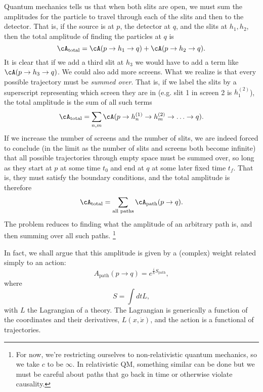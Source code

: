 Quantum mechanics tells us that when both slits are open, we must sum the amplitudes for the particle to travel through each of the slits and then to the detector. That is, if the source is at $p$, the detector at $q$, and the slits at $h_1,h_2$, then the total amplitude of finding the particles at $q$ is
\begin{equation}
    \cA_\text{total} = \cA(p \to h_1 \to q) + \cA(p \to h_2 \to q).
\end{equation}
It is clear that if we add a third slit at $h_3$ we would have to add a term like $\cA (p \to h_3 \to q)$. We could also add more screens. What we realize is that every possible trajectory must be \emph{summed over}. That is, if we label the slits by a superscript representing which screen they are in (e.g. slit 1 in screen 2 is $h_1^{(2)}$), the total amplitude is the sum of all such terms
\begin{equation}
    \cA_\text{total} = \sum_{n,m} \cA(p \to h_n^{(1)} \to h_m^{(2)} \to \ldots \to q).
\end{equation}
If we increase the number of screens and the number of slits, we are indeed forced to conclude (in the limit as the number of slits and screens both become infinite) that all possible trajectories through empty space must be summed over, so long as they start at $p$ at some time $t_0$ and end at $q$ at some later fixed time $t_f$. That is, they must satisfy the boundary conditions, and the total amplitude is therefore
\begin{equation}
    \cA_\text{total} = \sum_\text{all paths} \cA_\text{path} (p \to q).
\end{equation}
The problem reduces to finding what the amplitude of an arbitrary path is, and then summing over all such paths.%
    \footnote{For now, we're restricting ourselves to non-relativistic quantum mechanics, so we take $c$ to be $\infty$. In relativistic QM, something similar can be done but we must be careful about paths that go back in time or otherwise violate causality.}

In fact, we shall argue that this amplitude is given by a (complex) weight related simply to an action:
\begin{equation}
    A_\text{path} (p \to q) = e^{\frac{i}{\hbar} S_\text{path}},
\end{equation}
where
\begin{equation}
    S=\int dt L,
\end{equation}
with $L$ the Lagrangian of a theory. The Lagrangian is generically a function of the coordinates and their derivatives, $L(x,\dot x)$, and the action is a functional of trajectories.

